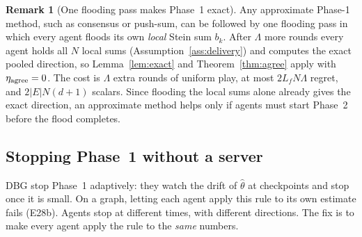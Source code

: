 \documentclass[11pt]{article}
\theoremstyle{definition}
\newtheorem{remark}{Remark}
\begin{document}
\begin{remark}[One flooding pass makes Phase~1 exact]\label{rem:agreepass}
Any approximate Phase-1 method, such as consensus or push-sum, can be followed by one flooding pass in which every agent
floods its own \emph{local} Stein sum $b_k$. After $\Lambda$ more rounds every agent holds all $N$ local sums
(Assumption~\ref{ass:delivery}) and computes the exact pooled direction, so Lemma~\ref{lem:exact} and
Theorem~\ref{thm:agree} apply with $\eta_{\rm agree}=0$. The cost is $\Lambda$ extra rounds of uniform play, at most
$2L_fN\Lambda$ regret, and $2|E|N(d+1)$ scalars. Since flooding the local sums alone already gives the exact direction,
an approximate method helps only if agents must start Phase~2 before the flood completes.
\end{remark}

\subsection{Stopping Phase~1 without a server}

DBG stop Phase~1 adaptively: they watch the drift of $\hat\theta$ at checkpoints and stop once it is small. On a graph,
letting each agent apply this rule to its own estimate fails (E28b). Agents stop at different times, with different
directions. The fix is to make every agent apply the rule to the \emph{same} numbers.
\end{document}
